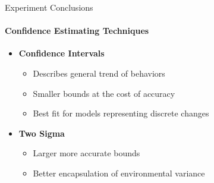 \documentclass{beamer}
\begin{document}
\begin{frame}[t]{Experiment Conclusions}
  \framesubtitle{Confidence Estimating Techniques}
  \vspace*{+.25cm}

  \begin{itemize}
  \setlength\itemsep{1.25em}
    \item \textbf{Confidence Intervals}
      \begin{itemize}
        \item Describes general trend of behaviors
        \item Smaller bounds at the cost of accuracy
        \item Best fit for models representing discrete changes
      \end{itemize}

    \item \textbf{Two Sigma}
      \begin{itemize}
        \item Larger more accurate bounds
        \item Better encapsulation of environmental variance
      \end{itemize}

  \end{itemize}
\end{frame}
\end{document}
